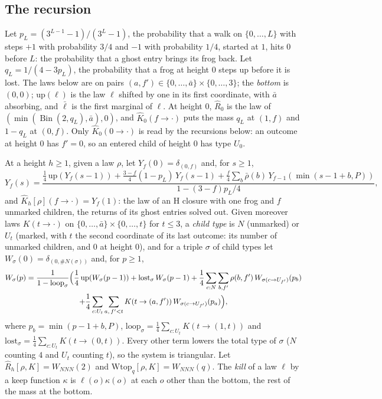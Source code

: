 \documentclass[11pt]{amsart}
\theoremstyle{definition}
\numberwithin{equation}{section}
\newcommand{\Bin}{\operatorname{Bin}}
\begin{document}
\subsection*{The recursion}
Let $p_L=(3^{L-1}-1)/(3^L-1)$, the probability that a walk on $\{0,\dots,L\}$ with steps $+1$ with probability $3/4$ and $-1$ with probability $1/4$, started at $1$, hits $0$ before $L$: the probability that a ghost entry brings its frog back. Let $q_L=1/(4-3p_L)$, the probability that a frog at height $0$ steps up before it is lost. The laws below are on pairs $(a,f')\in\{0,\dots,\bar a\}\times\{0,\dots,3\}$; the \emph{bottom} is $(0,0)$; $\mathrm{up}(\ell)$ is the law $\ell$ shifted by one in its first coordinate, with $\bar a$ absorbing, and $\bar\ell$ is the first marginal of $\ell$. At height $0$, $\widehat R_0$ is the law of $(\min(\Bin(2,q_L),\bar a),0)$, and $\widehat K_0(f\to\cdot)$ puts the mass $q_L$ at $(1,f)$ and $1-q_L$ at $(0,f)$. Only $\widehat K_0(0\to\cdot)$ is read by the recursions below: an outcome at height $0$ has $f'=0$, so an entered child of height $0$ has type $U_0$.

At a height $h\ge1$, given a law $\rho$, let $Y_f(0)=\delta_{(0,f)}$ and, for $s\ge1$,
\[
Y_f(s)=\frac{\frac14\,\mathrm{up}(Y_f(s-1))+\frac{3-f}4(1-p_L)\,Y_f(s-1)+\frac f4\sum_b\bar\rho(b)\,Y_{f-1}(\min(s-1+b,P))}{1-(3-f)p_L/4},
\]
and $\widehat K_h[\rho](f\to\cdot)=Y_f(1)$: the law of an H closure with one frog and $f$ unmarked children, the returns of its ghost entries solved out. Given moreover laws $K(t\to\cdot)$ on $\{0,\dots,\bar a\}\times\{0,\dots,t\}$ for $t\le3$, a \emph{child type} is $N$ (unmarked) or $U_t$ (marked, with $t$ the second coordinate of its last outcome: its number of unmarked children, and $0$ at height $0$), and for a triple $\sigma$ of child types let $W_\sigma(0)=\delta_{(0,\#N(\sigma))}$ and, for $p\ge1$,
\begin{multline*}
W_\sigma(p)=\frac1{1-\mathrm{loop}_\sigma}\Bigl(\frac14\,\mathrm{up}(W_\sigma(p-1))+\mathrm{lost}_\sigma\,W_\sigma(p-1)+\frac14\sum_{c:N}\sum_{b,f'}\rho(b,f')\,W_{\sigma(c\to U_{f'})}(p_b)\\
+\frac14\sum_{c:U_t}\sum_{a,\,f'<t}K(t\to(a,f'))\,W_{\sigma(c\to U_{f'})}(p_a)\Bigr),
\end{multline*}
where $p_b=\min(p-1+b,P)$, $\mathrm{loop}_\sigma=\frac14\sum_{c:U_t}K(t\to(1,t))$ and $\mathrm{lost}_\sigma=\frac14\sum_{c:U_t}K(t\to(0,t))$. Every other term lowers the total type of $\sigma$ ($N$ counting $4$ and $U_t$ counting $t$), so the system is triangular. Let $\widehat R_h[\rho,K]=W_{NNN}(2)$ and $\mathrm{Wtop}_q[\rho,K]=W_{NNN}(q)$. The \emph{kill} of a law $\ell$ by a keep function $\kappa$ is $\ell(o)\kappa(o)$ at each $o$ other than the bottom, the rest of the mass at the bottom.
\end{document}
